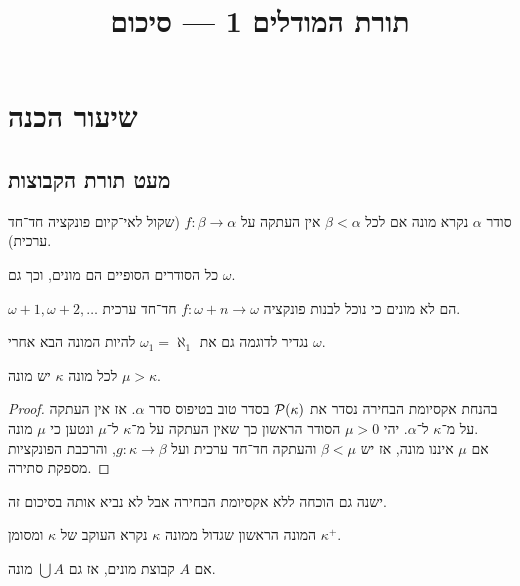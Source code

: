 
\title{תורת המודלים 1 --- סיכום}
\setcounter{secnumdepth}{2}

\usepackage{fancyhdr}
\pagestyle{fancy}
\renewcommand{\headrulewidth}{0pt}


\maketitle
\maketitleprint[purple]

\tableofcontents

\setcounter{section}{-1}
\section{שיעור הכנה}
\subsection{מעט תורת הקבוצות}
\begin{definition}[מונה]
	סודר $\alpha$ נקרא מונה אם לכל $\beta < \alpha$ אין העתקה על $f : \beta \to \alpha$ (שקול לאי־קיום פונקציה חד־חד ערכית).
\end{definition}
\begin{example}
	כל הסודרים הסופיים הם מונים, וכך גם $\omega$.
\end{example}
\begin{example} 
	$\omega + 1, \omega + 2, \ldots$ הם לא מונים כי נוכל לבנות פונקציה $f : \omega + n \to \omega$ חד־חד ערכית.
\end{example}
נגדיר לדוגמה גם את $\omega_1 = \aleph_1$ להיות המונה הבא אחרי $\omega$.
\begin{theorem}
	לכל מונה $\kappa$ יש מונה $\mu > \kappa$.
\end{theorem}
\begin{proof}
	בהנחת אקסיומת הבחירה נסדר את $\mathcal{P}(\kappa)$ בסדר טוב בטיפוס סדר $\alpha$.
	אז אין העתקה על מ־$\kappa$ ל־$\alpha$.
	יהי $\mu > 0$ הסודר הראשון כך שאין העתקה על מ־$\kappa$ ל־$\mu$ ונטען כי $\mu$ מונה. \\
	אם $\mu$ איננו מונה, אז יש $\beta < \mu$ והעתקה חד־חד ערכית ועל $g : \kappa \to \beta$, והרכבת הפונקציות מספקת סתירה.
\end{proof}
ישנה גם הוכחה ללא אקסיומת הבחירה אבל לא נביא אותה בסיכום זה.
\begin{definition}
	המונה הראשון שגדול ממונה $\kappa$ נקרא העוקב של $\kappa$ ומסומן $\kappa^+$.
\end{definition}
\begin{remark}
	אם $A$ קבוצת מונים, אז גם $\bigcup A$ מונה.
\end{remark}
